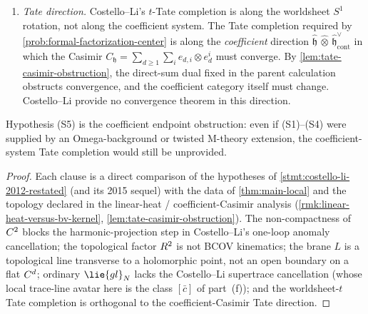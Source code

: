 \begin{prop}
\begin{enumerate}
      ordinary $\lie{gl}_N$. The U(1) center class $[\bar c]$ in
      part~(f) of \ref{thm:main-local} is the local trace-line avatar of
      that Costello--Li anomaly, not a graph-level identification with it.
    \item[(S5)] \emph{Tate direction.} Costello--Li's $t$-Tate
      completion is along the worldsheet $S^1$ rotation, not along
      the coefficient system. The Tate completion required by
      \ref{prob:formal-factorization-center} is along the
      \emph{coefficient} direction
      $\widehat{\mathfrak h}\,\widehat\otimes\,
      \widehat{\mathfrak h}^{\vee}_{\mathrm{cont}}$ in which the
      Casimir
      $C_{\mathfrak h}=\sum_{d\geq 1}\sum_i e_{d,i}\otimes e^i_d$
      must converge. By \ref{lem:tate-casimir-obstruction}, the
      direct-sum dual fixed in the parent calculation obstructs
      convergence, and the coefficient category itself must change.
      Costello--Li provide no convergence theorem in this direction.
  \end{enumerate}

  Hypothesis (S5) is the coefficient endpoint obstruction: even if
  (S1)--(S4) were supplied by an Omega-background or twisted M-theory
  extension, the coefficient-system Tate completion would still be
  unprovided.
\end{prop}

\begin{proof}
  Each clause is a direct comparison of the hypotheses of
  \ref{stmt:costello-li-2012-restated} (and its 2015 sequel) with
  the data of \ref{thm:main-local} and the topology declared in
  the linear-heat / coefficient-Casimir analysis
  (\ref{rmk:linear-heat-versus-bv-kernel},
  \ref{lem:tate-casimir-obstruction}). The non-compactness of
  $C^2$ blocks the harmonic-projection step in Costello--Li's
  one-loop anomaly cancellation; the topological factor $R^2$ is
  not BCOV kinematics; the brane \(L\) is a topological
  line transverse to a holomorphic point, not an open boundary on a
  flat $C^d$; ordinary $\lie{gl}_N$ lacks the Costello--Li
  supertrace cancellation (whose local trace-line avatar here is the
  class $[\bar c]$ of part~(f)); and the worldsheet-$t$ Tate completion
  is orthogonal to the coefficient-Casimir Tate direction.
\end{proof}

